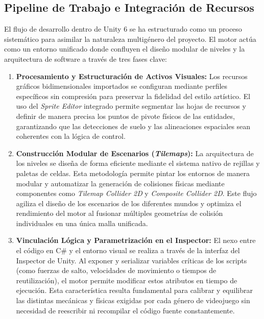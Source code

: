 \subsection{Pipeline de Trabajo e Integración de Recursos}
El flujo de desarrollo dentro de Unity 6 se ha estructurado como un proceso sistemático para asimilar la naturaleza multigénero del proyecto. El motor actúa como un entorno unificado donde confluyen el diseño modular de niveles y la arquitectura de software a través de tres fases clave:

\begin{enumerate}
    \item \textbf{Procesamiento y Estructuración de Activos Visuales:} Los recursos gráficos bidimensionales importados se configuran mediante perfiles específicos sin compresión para preservar la fidelidad del estilo artístico. El uso del \textit{Sprite Editor} integrado permite segmentar las hojas de recursos y definir de manera precisa los puntos de pivote físicos de las entidades, garantizando que las detecciones de suelo y las alineaciones espaciales sean coherentes con la lógica de control.
    
    \item \textbf{Construcción Modular de Escenarios (\textit{Tilemaps}):} La arquitectura de los niveles se diseña de forma eficiente mediante el sistema nativo de rejillas y paletas de celdas. Esta metodología permite pintar los entornos de manera modular y automatizar la generación de colisiones físicas mediante componentes como \textit{Tilemap Collider 2D} y \textit{Composite Collider 2D}. Este flujo agiliza el diseño de los escenarios de los diferentes mundos y optimiza el rendimiento del motor al fusionar múltiples geometrías de colisión individuales en una única malla unificada.
    
    \item \textbf{Vinculación Lógica y Parametrización en el Inspector:} El nexo entre el código en C\# y el entorno visual se realiza a través de la interfaz del Inspector de Unity. Al exponer y serializar variables críticas de los scripts (como fuerzas de salto, velocidades de movimiento o tiempos de reutilización), el motor permite modificar estos atributos en tiempo de ejecución. Esta característica resulta fundamental para calibrar y equilibrar las distintas mecánicas y físicas exigidas por cada género de videojuego sin necesidad de reescribir ni recompilar el código fuente constantemente.
\end{enumerate}



